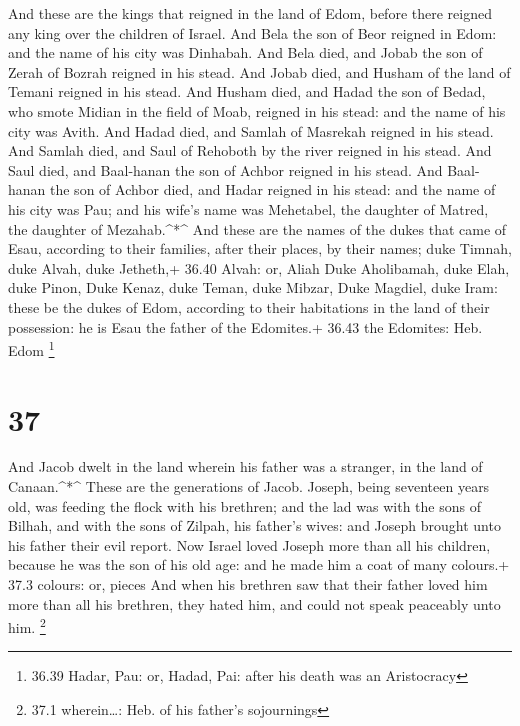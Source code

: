  And these are the kings that reigned in the land of Edom,
before there reigned any king over the children of Israel. 
And Bela the son of Beor reigned in Edom: and the name of his city was
Dinhabah.  And Bela died, and Jobab the son of Zerah of
Bozrah reigned in his stead.  And Jobab died, and Husham of
the land of Temani reigned in his stead.  And Husham died,
and Hadad the son of Bedad, who smote Midian in the field of Moab,
reigned in his stead: and the name of his city was Avith. 
And Hadad died, and Samlah of Masrekah reigned in his stead.
 And Samlah died, and Saul of Rehoboth by the river reigned
in his stead.  And Saul died, and Baal-hanan the son of
Achbor reigned in his stead.  And Baal-hanan the son of
Achbor died, and Hadar reigned in his stead: and the name of his city
was Pau; and his wife's name was Mehetabel, the daughter of Matred, the
daughter of Mezahab.\^{}*\^{}  And these are the names of
the dukes that came of Esau, according to their families, after their
places, by their names; duke Timnah, duke Alvah, duke Jetheth,+ 36.40
Alvah: or, Aliah  Duke Aholibamah, duke Elah, duke Pinon,
 Duke Kenaz, duke Teman, duke Mibzar,  Duke
Magdiel, duke Iram: these be the dukes of Edom, according to their
habitations in the land of their possession: he is Esau the father of
the Edomites.+ 36.43 the Edomites: Heb. Edom \footnote{36.39 Hadar, Pau:
  or, Hadad, Pai: after his death was an Aristocracy}

\hypertarget{section-36}{%
\section{37}\label{section-36}}

 And Jacob dwelt in the land wherein his father was a
stranger, in the land of Canaan.\^{}*\^{}  These are the
generations of Jacob. Joseph, being seventeen years old, was feeding the
flock with his brethren; and the lad was with the sons of Bilhah, and
with the sons of Zilpah, his father's wives: and Joseph brought unto his
father their evil report.  Now Israel loved Joseph more than
all his children, because he was the son of his old age: and he made him
a coat of many colours.+ 37.3 colours: or, pieces  And when
his brethren saw that their father loved him more than all his brethren,
they hated him, and could not speak peaceably unto him. \footnote{37.1
  wherein\ldots: Heb. of his father's sojournings}

